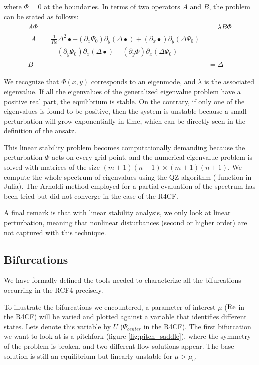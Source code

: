 where $\Phi = 0$ at the boundaries. In terms of two operators $A$ and $B$,
the problem can be stated as follows: 
\begin{align} \label{eq:eig_prob}
  \begin{split}
  A \Phi & = \lambda B \Phi \\[4pt]
  \begin{split}
  A & = \frac{1}{Re} \Delta^2 \bullet
    + (\partial_x \Psi_0) \partial_y (\Delta \bullet)
    + (\partial_x \bullet) \partial_y (\Delta \Psi_0) \\
    &\quad - (\partial_y \Psi_0) \partial_x (\Delta \bullet)
    - (\partial_y \Phi) \partial_x (\Delta \Psi_0)
  \end{split} \\
  B & = \Delta
  \end{split}
\end{align}

We recognize that $\Phi(x,y)$ corresponds to an eigenmode, and $\lambda$ is the
associated eigenvalue. If all the eigenvalues of the generalized eigenvalue
problem have a positive real part, the equilibrium is stable. On the contrary,
if only one of the eigenvalues is found to be positive, then the system is
unstable because a small perturbation will grow exponentially in time, which
can be directly seen in the definition of the ansatz.

This linear stability problem becomes computationally demanding because the
perturbation $\Phi$ acts on every grid point, and the numerical eigenvalue
problem is solved with matrices of the size $(m+1)(n+1) \times (m+1)(n+1)$. We
compute the whole spectrum of eigenvalues using the QZ algorithm (
function in Julia). The Arnoldi
method employed for a partial evaluation of the spectrum has been tried but
did not converge in the case of the R4CF.

A final remark is that with linear stability analysis, we only look at linear
perturbation, meaning that nonlinear disturbances (second or higher order) are
not captured with this technique.

\subsection{Bifurcations} \label{sec:bif_details}

We have formally defined the tools needed to characterize all the bifurcations
occurring in the RCF4 precisely. 

To illustrate the bifurcations we encountered, a parameter of interest $\mu$
($\mathrm{Re}$ in the R4CF) will be varied and plotted against a variable that
identifies different states. Lets denote this variable by $U$ ($\Psi_{center}$
in the R4CF). The first bifurcation we want to look at is a pitchfork (figure
\ref{fig:pitch_saddle}), where the symmetry of the problem is broken, and two
different flow solutions appear. The base solution is still an equilibrium but
linearly unstable for $\mu > \mu_c$.

